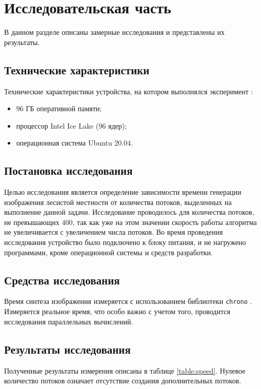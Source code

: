 \chapter{Исследовательская часть}

В данном разделе описаны замерные исследования и представлены их результаты.

\section{Технические характеристики}
Технические характеристики устройства, на котором выполнялся эксперимент \cite{bib:15}:
\begin{itemize}
	\item 96 ГБ оперативной памяти;
	\item процессор Intel Ice Lake (96 ядер);
    \item операционная система Ubuntu 20.04.
\end{itemize}

\section{Постановка исследования}
Целью исследования является определение зависимости времени генерации изображения лесистой местности от количества потоков, выделенных на выполнение данной задачи. Исследование проводилось для количества потоков, не превышающих 400, так как уже на этом значении скорость работы алгоритма не увеличивается с увеличением числа потоков. Во время проведения исследования устройство было подключено к блоку питания, и не нагружено программами, кроме операционной системы и средств разработки. 

\section{Средства исследования}
Время синтеза изображения измеряется с использованием библиотеки \texttt{chrono} \cite{bib:19}. Измеряется реальное время, что особо важно с учетом того, проводится исследования параллельных вычислений.

\section{Результаты исследования}
Полученные результаты измерения описаны в таблице \ref{table:speed}. Нулевое количество потоков означает отсутствие создания дополнительных потоков.
\newpage


